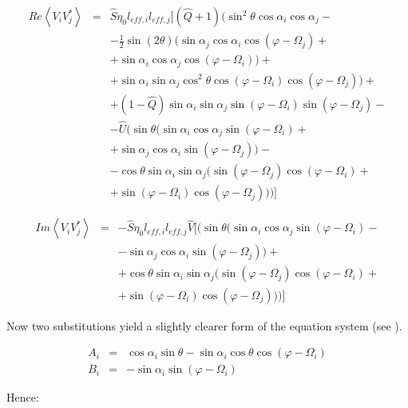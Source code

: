 \documentclass[a4paper,11pt]{report}
\begin{document}
\begin{eqnarray}
Re \left\langle V_i V_j^{*}\right\rangle &=& \hat{S}\eta_0 l_{eff,i} l_{eff,j}[(\hat{Q}+1) (\sin^2 \theta \cos \alpha_i \cos \alpha_j - \\
& & - \frac{1}{2}  \sin(2\theta) (\sin \alpha_j \cos \alpha_i \cos(\varphi - \Omega_j)+\nonumber \\
& & +\sin \alpha_i \cos \alpha_j \cos(\varphi - \Omega_i) ) + \nonumber \\
& & + \sin \alpha_i \sin \alpha_j \cos^2\theta \cos(\varphi - \Omega_i) \cos(\varphi - \Omega_j))+ \nonumber \\
& & + (1-\hat{Q}) \sin \alpha_i \sin \alpha_j \sin (\varphi - \Omega_i) \sin (\varphi - \Omega_j)-\nonumber \\
& & -\hat{U} (\sin \theta(\sin \alpha_i \cos \alpha_j \sin (\varphi - \Omega_i) +  \nonumber \\
& & + \sin \alpha_j \cos \alpha_i \sin (\varphi - \Omega_j))- \nonumber \\
& & - \cos \theta \sin \alpha_i \sin \alpha_j(\sin (\varphi - \Omega_j) \cos (\varphi - \Omega_i)+ \nonumber \\
& & + \sin (\varphi - \Omega_i) \cos (\varphi - \Omega_j) ) )]\nonumber
\end{eqnarray}

\begin{eqnarray}
Im \left\langle V_i V_j^{*}\right\rangle &=& - \hat{S}\eta_0 l_{eff,i} l_{eff,j} \hat{V}[ (\sin \theta(\sin \alpha_i \cos \alpha_j \sin (\varphi - \Omega_i) - \nonumber \\
& & - \sin \alpha_j \cos \alpha_i \sin (\varphi - \Omega_j))+  \\
& & +\cos \theta \sin \alpha_i \sin \alpha_j(\sin (\varphi - \Omega_j) \cos (\varphi - \Omega_i)+ \nonumber \\
& & + \sin (\varphi - \Omega_i) \cos (\varphi - \Omega_j) ) )]\nonumber
\end{eqnarray}

Now two substitutions yield a slightly clearer form of the equation system (see \cite{cecconi04}).

\begin{eqnarray}
A_i &=& \cos \alpha_i \sin \theta - \sin \alpha_i \cos \theta \cos (\varphi - \Omega_i)\label{A_i} \\
B_i &=& -\sin \alpha_i \sin (\varphi - \Omega_i) \label{B_i}
\end{eqnarray}

Hence:
\end{document}
